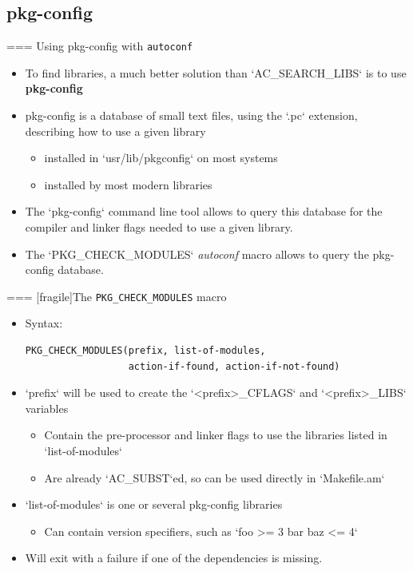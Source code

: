 \subsection{pkg-config}

=== {Using pkg-config with {\tt autoconf}}

  \begin{itemize}

  \item To find libraries, a much better solution than
    `AC_SEARCH_LIBS` is to use {\bf pkg-config}

  \item pkg-config is a database of small text files, using the
    `.pc` extension, describing how to use a given library
    \begin{itemize}
    \item installed in `usr/lib/pkgconfig` on most systems
    \item installed by most modern libraries
    \end{itemize}

  \item The `pkg-config` command line tool allows to query this
    database for the compiler and linker flags needed to use a given
    library.

  \item The `PKG_CHECK_MODULES` {\em autoconf} macro allows to
    query the pkg-config database.

  \end{itemize}



=== [fragile]{The {\tt PKG\_CHECK\_MODULES} macro}
\begin{itemize}
\item Syntax:
  \begin{block}{}
\begin{verbatim}
PKG_CHECK_MODULES(prefix, list-of-modules,
                  action-if-found, action-if-not-found)
\end{verbatim}
  \end{block}
\item `prefix` will be used to create the
  `<prefix>_CFLAGS` and `<prefix>_LIBS` variables
  \begin{itemize}
  \item Contain the pre-processor and linker flags to use the
    libraries listed in `list-of-modules`
  \item Are already `AC_SUBST`ed, so can be used directly in
    `Makefile.am`
  \end{itemize}
\item `list-of-modules` is one or several pkg-config libraries
  \begin{itemize}
  \item Can contain version specifiers, such as `foo >= 3 bar
      baz <= 4`
  \end{itemize}
\item Will exit with a failure if one of the dependencies is missing.
\end{itemize}


